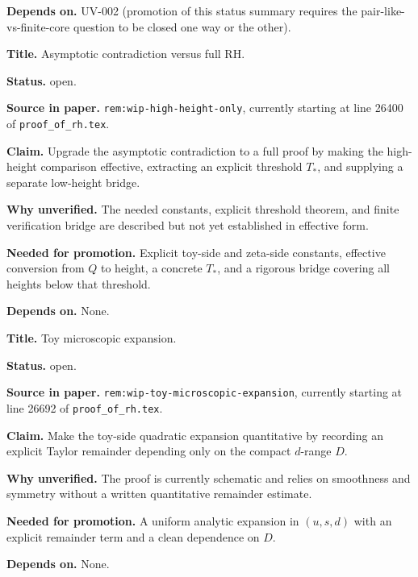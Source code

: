 \documentclass[11pt,a4paper]{amsart}
\begin{document}
\begin{description}[style=nextline,leftmargin=2.9cm,font=\normalfont\bfseries]
\textbf{Depends on.} UV-002 (promotion of this status summary requires the
pair-like-vs-finite-core question to be closed one way or the other).

\item[UV-008]
\textbf{Title.} Asymptotic contradiction versus full RH.

\textbf{Status.} open.

\textbf{Source in paper.} \texttt{rem:wip-high-height-only}, currently
starting at line 26400 of \texttt{proof\_of\_rh.tex}.

\textbf{Claim.} Upgrade the asymptotic contradiction to a full proof by making
the high-height comparison effective, extracting an explicit threshold $T_*$,
and supplying a separate low-height bridge.

\textbf{Why unverified.} The needed constants, explicit threshold theorem, and
finite verification bridge are described but not yet established in effective
form.

\textbf{Needed for promotion.} Explicit toy-side and zeta-side constants,
effective conversion from $Q$ to height, a concrete $T_*$, and a rigorous bridge
covering all heights below that threshold.

\textbf{Depends on.} None.

\item[UV-009]
\textbf{Title.} Toy microscopic expansion.

\textbf{Status.} open.

\textbf{Source in paper.} \texttt{rem:wip-toy-microscopic-expansion},
currently starting at line 26692 of \texttt{proof\_of\_rh.tex}.

\textbf{Claim.} Make the toy-side quadratic expansion quantitative by recording
an explicit Taylor remainder depending only on the compact $d$-range $D$.

\textbf{Why unverified.} The proof is currently schematic and relies on
smoothness and symmetry without a written quantitative remainder estimate.

\textbf{Needed for promotion.} A uniform analytic expansion in $(u,s,d)$ with an
explicit remainder term and a clean dependence on $D$.

\textbf{Depends on.} None.

\end{description}
\end{document}
